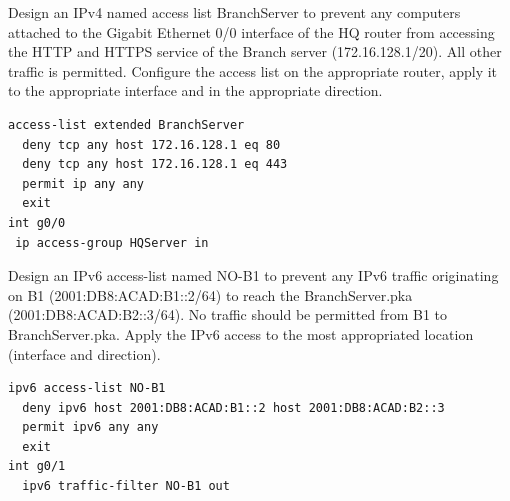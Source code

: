 \begin{example}
Design an IPv4 named access list BranchServer to prevent any computers attached to the Gigabit Ethernet 0/0 interface of the HQ router from accessing the HTTP and HTTPS service of the Branch server (172.16.128.1/20). All other traffic is permitted. Configure the access list on the appropriate router, apply it to the appropriate interface and in the appropriate direction.
\begin{verbatim}
access-list extended BranchServer
  deny tcp any host 172.16.128.1 eq 80
  deny tcp any host 172.16.128.1 eq 443
  permit ip any any
  exit
int g0/0
 ip access-group HQServer in
\end{verbatim}
\end{example}

\begin{example}
 Design an IPv6 access-list named NO-B1 to prevent any IPv6 traffic originating on B1 (2001:DB8:ACAD:B1::2/64) to reach the BranchServer.pka (2001:DB8:ACAD:B2::3/64). No traffic should be permitted from B1 to BranchServer.pka. Apply the IPv6 access to the most appropriated location (interface and direction).
\begin{verbatim}
ipv6 access-list NO-B1
  deny ipv6 host 2001:DB8:ACAD:B1::2 host 2001:DB8:ACAD:B2::3
  permit ipv6 any any
  exit
int g0/1
  ipv6 traffic-filter NO-B1 out
\end{verbatim}
\end{example}

